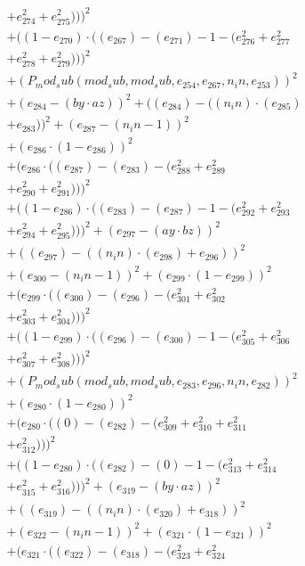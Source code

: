 \documentclass[10pt, a4paper]{article}
\begin{document}
\begin{small}
\begin{align*}
& + e_{274}^{2} + e_{275}^{2})))^{2} \\
& + ((1 - e_{270})  \cdot  ((e_{267}) - (e_{271}) - 1 - (e_{276}^{2} + e_{277}^{2} \\
& + e_{278}^{2} + e_{279}^{2})))^{2} \\
& + (P_mod_sub(mod_sub, mod_sub, e_{254}, e_{267}, n_in, e_{253}))^{2} \\
& + (e_{284} - (by  \cdot  az))^{2} + ((e_{284}) - ((n_in)  \cdot  (e_{285}) \\
& + e_{283}))^{2} + (e_{287} - (n_in - 1))^{2} \\
& + (e_{286}  \cdot  (1 - e_{286}))^{2} \\
& + (e_{286}  \cdot  ((e_{287}) - (e_{283}) - (e_{288}^{2} + e_{289}^{2} \\
& + e_{290}^{2} + e_{291}^{2})))^{2} \\
& + ((1 - e_{286})  \cdot  ((e_{283}) - (e_{287}) - 1 - (e_{292}^{2} + e_{293}^{2} \\
& + e_{294}^{2} + e_{295}^{2})))^{2} + (e_{297} - (ay  \cdot  bz))^{2} \\
& + ((e_{297}) - ((n_in)  \cdot  (e_{298}) + e_{296}))^{2} \\
& + (e_{300} - (n_in - 1))^{2} + (e_{299}  \cdot  (1 - e_{299}))^{2} \\
& + (e_{299}  \cdot  ((e_{300}) - (e_{296}) - (e_{301}^{2} + e_{302}^{2} \\
& + e_{303}^{2} + e_{304}^{2})))^{2} \\
& + ((1 - e_{299})  \cdot  ((e_{296}) - (e_{300}) - 1 - (e_{305}^{2} + e_{306}^{2} \\
& + e_{307}^{2} + e_{308}^{2})))^{2} \\
& + (P_mod_sub(mod_sub, mod_sub, e_{283}, e_{296}, n_in, e_{282}))^{2} \\
& + (e_{280}  \cdot  (1 - e_{280}))^{2} \\
& + (e_{280}  \cdot  ((0) - (e_{282}) - (e_{309}^{2} + e_{310}^{2} + e_{311}^{2} \\
& + e_{312}^{2})))^{2} \\
& + ((1 - e_{280})  \cdot  ((e_{282}) - (0) - 1 - (e_{313}^{2} + e_{314}^{2} \\
& + e_{315}^{2} + e_{316}^{2})))^{2} + (e_{319} - (by  \cdot  az))^{2} \\
& + ((e_{319}) - ((n_in)  \cdot  (e_{320}) + e_{318}))^{2} \\
& + (e_{322} - (n_in - 1))^{2} + (e_{321}  \cdot  (1 - e_{321}))^{2} \\
& + (e_{321}  \cdot  ((e_{322}) - (e_{318}) - (e_{323}^{2} + e_{324}^{2} \\

\end{align*}
\end{small}
\end{document}
